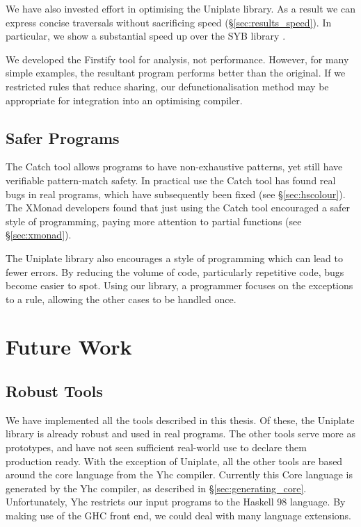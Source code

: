 We have also invested effort in optimising the Uniplate library. As a result we can express concise traversals without sacrificing speed (\S\ref{sec:results_speed}). In particular, we show a substantial speed up over the SYB library \cite{lammel:syb}.

We developed the Firstify tool for analysis, not performance. However, for many simple examples, the resultant program performs better than the original. If we restricted rules that reduce sharing, our defunctionalisation method may be appropriate for integration into an optimising compiler.

\subsection{Safer Programs}

The Catch tool allows programs to have non-exhaustive patterns, yet still have verifiable pattern-match safety. In practical use the Catch tool has found real bugs in real programs, which have subsequently been fixed (see \S\ref{sec:hscolour}). The XMonad developers found that just using the Catch tool encouraged a safer style of programming, paying more attention to partial functions (see \S\ref{sec:xmonad}).

The Uniplate library also encourages a style of programming which can lead to fewer errors. By reducing the volume of code, particularly repetitive code, bugs become easier to spot. Using our library, a programmer focuses on the exceptions to a rule, allowing the other cases to be handled once.

\section{Future Work}
\label{sec:future_work}

\subsection{Robust Tools}

We have implemented all the tools described in this thesis. Of these, the Uniplate library is already robust and used in real programs. The other tools serve more as prototypes, and have not seen sufficient real-world use to declare them production ready. With the exception of Uniplate, all the other tools are based around the core language from the Yhc compiler. Currently this Core language is generated by the Yhc compiler, as described in \S\ref{sec:generating_core}. Unfortunately, Yhc restricts our input programs to the Haskell 98 language. By making use of the GHC front end, we could deal with many language extensions.

